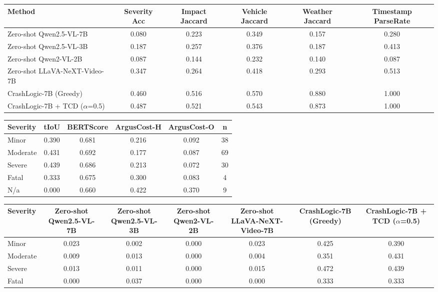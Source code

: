 \begin{tabular}{lccccc}
\toprule
Method & Severity Acc & Impact Jaccard & Vehicle Jaccard & Weather Jaccard & Timestamp ParseRate \\
\midrule
Zero-shot Qwen2.5-VL-7B & 0.080 & 0.223 & 0.349 & 0.157 & 0.280 \\
Zero-shot Qwen2.5-VL-3B & 0.187 & 0.257 & 0.376 & 0.187 & 0.413 \\
Zero-shot Qwen2-VL-2B & 0.087 & 0.144 & 0.232 & 0.140 & 0.087 \\
Zero-shot LLaVA-NeXT-Video-7B & 0.347 & 0.264 & 0.418 & 0.293 & 0.513 \\
CrashLogic-7B (Greedy) & 0.460 & 0.516 & 0.570 & 0.880 & 1.000 \\
CrashLogic-7B + TCD ($\alpha$=0.5) & 0.487 & 0.521 & 0.543 & 0.873 & 1.000 \\
\bottomrule
\end{tabular}


\begin{tabular}{lccccc}
\toprule
Severity & tIoU & BERTScore & ArgusCost-H & ArgusCost-O & n \\
\midrule
Minor & 0.390 & 0.681 & 0.216 & 0.092 & 38 \\
Moderate & 0.431 & 0.692 & 0.177 & 0.087 & 69 \\
Severe & 0.439 & 0.686 & 0.213 & 0.072 & 30 \\
Fatal & 0.333 & 0.675 & 0.300 & 0.083 & 4 \\
N/a & 0.000 & 0.660 & 0.422 & 0.370 & 9 \\
\bottomrule
\end{tabular}


\begin{tabular}{lcccccc}
\toprule
Severity & Zero-shot Qwen2.5-VL-7B & Zero-shot Qwen2.5-VL-3B & Zero-shot Qwen2-VL-2B & Zero-shot LLaVA-NeXT-Video-7B & CrashLogic-7B (Greedy) & CrashLogic-7B + TCD ($\alpha$=0.5) \\
\midrule
Minor & 0.023 & 0.002 & 0.000 & 0.023 & 0.425 & 0.390 \\
Moderate & 0.009 & 0.013 & 0.000 & 0.004 & 0.351 & 0.431 \\
Severe & 0.013 & 0.011 & 0.000 & 0.015 & 0.472 & 0.439 \\
Fatal & 0.000 & 0.037 & 0.000 & 0.000 & 0.333 & 0.333 \\
\bottomrule
\end{tabular}


